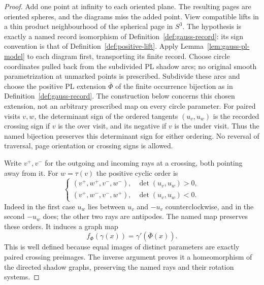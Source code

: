 \begin{proof}
Add one point at infinity to each oriented plane. The resulting pages are
oriented spheres, and the diagrams miss the added point. View compatible
lifts in a thin product neighbourhood of the spherical page in $S^3$.
The hypothesis is exactly a named record isomorphism of
Definition~\ref{def:gauss-record}: its sign convention is that of
Definition~\ref{def:positive-lift}. Apply Lemma~\ref{lem:gauss-pl-model} to each diagram first, transporting its
finite record. Choose circle coordinates pulled back from the subdivided
PL shadow arcs; no original smooth parametrization at unmarked points
is prescribed. Subdivide these arcs and choose the positive PL extension
$\overline\Phi$ of the finite occurrence bijection as in
Definition~\ref{def:gauss-record}. The construction below concerns this chosen
extension, not an arbitrary prescribed map on every circle parameter.
For paired visits $v,w$, the determinant sign of the ordered tangents
$(u_v,u_w)$ is the recorded crossing sign if $v$ is the over visit, and its
negative if $v$ is the under visit. Thus the named bijection preserves this
determinant sign for either ordering. No reversal of traversal, page
orientation or crossing signs is allowed.

Write $v^+,v^-$ for the outgoing and incoming rays at a crossing, both
pointing away from it. For $w=\tau(v)$ the positive cyclic order is
\begin{equation}\label{eq:gauss-ray-order}
 \begin{cases}
 (v^+,w^+,v^-,w^-),&\det(u_v,u_w)>0,\\
 (v^+,w^-,v^-,w^+),&\det(u_v,u_w)<0.
 \end{cases}
\end{equation}
Indeed in the first case $u_w$ lies between $u_v$ and $-u_v$
counterclockwise, and in the second $-u_w$ does; the other two rays are
antipodes. The named map preserves these orders. It induces a graph map
\begin{equation}\label{eq:gauss-shadow-map}
 f_\Phi(\gamma(x))=\gamma'(\overline\Phi(x)).
\end{equation}
This is well defined because equal images of distinct parameters are exactly
paired crossing preimages. The inverse argument proves it a homeomorphism
of the directed shadow graphs, preserving the named rays and their rotation
systems.


\end{proof}
